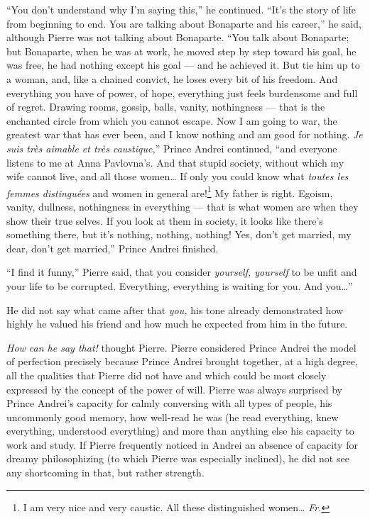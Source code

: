 ``You don't understand why I'm saying this,'' he continued. ``It's the story of life from beginning to end. You are talking about Bonaparte and his career,'' he said, although Pierre was not talking about Bonaparte. ``You talk about Bonaparte; but Bonaparte, when he was at work, he moved step by step toward his goal, he was free, he had nothing except his goal --- and he achieved it. But tie him up to a woman, and, like a chained convict, he loses every bit of his freedom. And everything you have of power, of hope, everything just feels burdensome and full of regret. Drawing rooms, gossip, balls, vanity, nothingness --- that is the enchanted circle from which you cannot escape. Now I am going to war, the greatest war that has ever been, and I know nothing and am good for nothing. \textit{Je suis tr\`es aimable et tr\`es caustique,}'' Prince Andrei continued, ``and everyone listens to me at Anna Pavlovna's. And that stupid society, without which my wife cannot live, and all those women\ldots{} If only you could know what \textit{toutes les femmes distingu\'ees} and women in general are!\footnote{I am very nice and very caustic. All these distinguished women\ldots{} \textit{Fr.}} My father is right. Egoism, vanity, dullness, nothingness in everything --- that is what women are when they show their true selves. If you look at them in society, it looks like there's something there, but it's nothing, nothing, nothing! Yes, don't get married, my dear, don't get married,'' Prince Andrei finished. %

``I find it funny,'' Pierre said, that you consider \emph{yourself, yourself} to be unfit and your life to be corrupted. Everything, everything is waiting for you. And you\ldots{}'' %

He did not say what came after that \emph{you,} his tone already demonstrated how highly he valued his friend and how much he expected from him in the future.

\textit{How can he say that!} thought Pierre. Pierre considered Prince Andrei the model of perfection precisely because Prince Andrei brought together, at a high degree, all the qualities that Pierre did not have and which could be most closely expressed by the concept of the power of will. Pierre was always surprised by Prince Andrei's capacity for calmly conversing with all types of people, his uncommonly good memory, how well-read he was (he read everything, knew everything, understood everything) and more than anything else his capacity to work and study. If Pierre frequently noticed in Andrei an absence of capacity for dreamy philosophizing (to which Pierre was especially inclined), he did not see any shortcoming in that, but rather strength.

